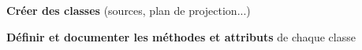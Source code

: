 \item \textbf{Créer des classes} (sources, plan de projection...)
\item \textbf{Définir et documenter les méthodes et attributs} de chaque classe

